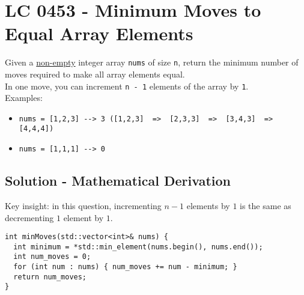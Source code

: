 \section{LC 0453 - Minimum Moves to Equal Array Elements}
Given a \ul{non-empty} integer array {\colorbox{CodeBackground}{\lstinline|nums|}} of size {\colorbox{CodeBackground}{\lstinline|n|}}, return the minimum number of moves required to make all array elements equal.\\

In one move, you can increment {\colorbox{CodeBackground}{\lstinline|n - 1|}} elements of the array by {\colorbox{CodeBackground}{\lstinline|1|}}.\\

Examples:
\begin{itemize}
\item {\colorbox{CodeBackground}{\lstinline|nums = [1,2,3] --> 3 ([1,2,3]  =>  [2,3,3]  =>  [3,4,3]  =>  [4,4,4])|}}
\item {\colorbox{CodeBackground}{\lstinline|nums = [1,1,1] --> 0|}}
\end{itemize}

\subsection*{Solution - Mathematical Derivation}
Key insight: in this question, incrementing $n-1$ elements by $1$ is the same as decrementing $1$ element by $1$. 
\begin{lstlisting}
int minMoves(std::vector<int>& nums) {
  int minimum = *std::min_element(nums.begin(), nums.end());
  int num_moves = 0;
  for (int num : nums) { num_moves += num - minimum; }
  return num_moves;
}
\end{lstlisting}
